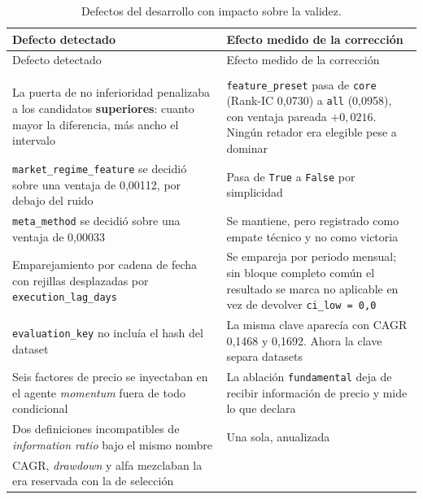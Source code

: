 \begin{longtable}{@{}>{\raggedright\arraybackslash}p{7.7cm}>{\raggedright\arraybackslash}p{7.7cm}@{}}
\caption{Defectos del desarrollo con impacto sobre la validez.}\label{tab:defectos}\\
\toprule
Defecto detectado & Efecto medido de la corrección \\
\midrule
\endfirsthead
\toprule
Defecto detectado & Efecto medido de la corrección \\
\midrule
\endhead
\midrule
\multicolumn{2}{r}{\footnotesize Continúa en la página siguiente}\\
\endfoot
\bottomrule
\endlastfoot
La puerta de no inferioridad penalizaba a los candidatos \textbf{superiores}: cuanto mayor la
diferencia, más ancho el intervalo &
\texttt{feature\_preset} pasa de \texttt{core} (Rank-IC 0,0730) a \texttt{all} (0,0958), con
ventaja pareada $+0{,}0216$. Ningún retador era elegible pese a dominar \\
\addlinespace
\texttt{market\_regime\_feature} se decidió sobre una ventaja de 0,00112, por debajo del ruido &
Pasa de \texttt{True} a \texttt{False} por simplicidad \\
\addlinespace
\texttt{meta\_method} se decidió sobre una ventaja de 0,00033 &
Se mantiene, pero registrado como empate técnico y no como victoria \\
\addlinespace
Emparejamiento por cadena de fecha con rejillas desplazadas por \texttt{execution\_lag\_days} &
Se empareja por periodo mensual; sin bloque completo común el resultado se marca no aplicable en
vez de devolver \texttt{ci\_low = 0,0} \\
\addlinespace
\texttt{evaluation\_key} no incluía el hash del dataset &
La misma clave aparecía con CAGR 0,1468 y 0,1692. Ahora la clave separa datasets \\
\addlinespace
Seis factores de precio se inyectaban en el agente \textit{momentum} fuera de todo condicional &
La ablación \texttt{fundamental} deja de recibir información de precio y mide lo que declara \\
\addlinespace
Dos definiciones incompatibles de \textit{information ratio} bajo el mismo nombre &
Una sola, anualizada \\
\addlinespace
CAGR, \textit{drawdown} y alfa mezclaban la era reservada con la de selección &

\end{longtable}
